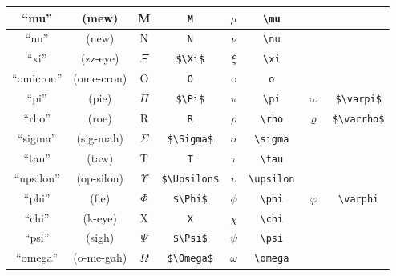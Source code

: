 \documentclass[final,10pt,letterpaper,landscape]{article}
\begin{document}
{\begin{tabular}{c | c || c | c || c | c | c | c}
    \hline
    \hline
    ``mu''      & (mew)       & M             & \texttt{M}           & $\mu$      & \verb#\mu#      & & \\
    \hline
    \hline
    ``nu''      & (new)       & N             & \texttt{N}           & $\nu$      & \verb#\nu#      & & \\
    \hline
    \hline
    ``xi''      & (zz-eye)    & $\Xi$         & \verb#$\Xi$#         & $\xi$      & \verb#\xi#      & & \\
    \hline
    \hline
    ``omicron'' & (ome-cron)  & O             & \texttt{O}           & o          & \texttt{o}      & & \\
    \hline
    \hline
    ``pi''      & (pie)       & $\Pi$         & \verb#$\Pi$#         & $\pi$      & \verb#\pi#      & $\varpi$      & \verb#$\varpi$# \\
    \hline
    \hline
    ``rho''     & (roe)       & R             & \texttt{R}           & $\rho$     & \verb#\rho#     & $\varrho$     & \verb#$\varrho$# \\
    \hline
    \hline
    ``sigma''   & (sig-mah)   & $\Sigma$      & \verb#$\Sigma$#      & $\sigma$   & \verb#\sigma#   & & \\
    \hline
    \hline
    ``tau''     & (taw)       & T             & \texttt{T}           & $\tau$     & \verb#\tau#     & & \\
    \hline
    \hline
    ``upsilon'' & (op-silon)  & $\Upsilon$    & \verb#$\Upsilon$#    & $\upsilon$ & \verb#\upsilon# & & \\
    \hline
    \hline
    ``phi''     & (fie)       & $\Phi$        & \verb#$\Phi$#        & $\phi$     & \verb#\phi#     & $\varphi$     & \verb#\varphi#   \\
    \hline
    \hline
    ``chi''     & (k-eye)     & X             & \texttt{X}           & $\chi$     & \verb#\chi#     & & \\
    \hline
    \hline
    ``psi''     & (sigh)      & $\Psi$        & \verb#$\Psi$#        & $\psi$     & \verb#\psi#     & & \\
    \hline
    \hline
    ``omega''   & (o-me-gah)  & $\Omega$      & \verb#$\Omega$#      & $\omega$   & \verb#\omega#   & &
  \end{tabular}
}
\end{document}
